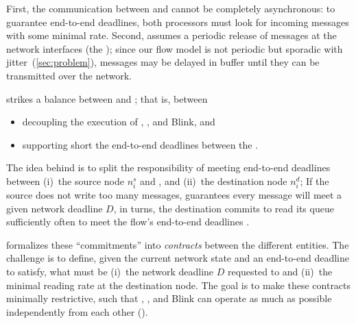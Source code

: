 First, the communication between \APs and \CPs cannot be completely asynchronous: to guarantee end-to-end deadlines, both processors must look for incoming messages with some minimal rate.
%
Second, \blink assumes a periodic release of messages at the network interfaces (\ie the \CPs); since our flow model is not periodic but sporadic with jitter~(\cref{sec:problem}), messages may be delayed in \CPs buffer until they can be transmitted over the network.

\DRP strikes a balance between   and ; that is, between
\begin{itemize}
  \item decoupling the execution of \APs, \CPs, and Blink, and
  \item supporting short the end-to-end deadlines between the \APs.
\end{itemize}
The idea behind \DRP is to split the responsibility of meeting end-to-end deadlines between (i)~the source node $n^s_i$ and \blink, and (ii)~the destination node $n^d_i$;
If the source does not write too many messages, \blink guarantees every message will meet a given network deadline $D$, in turns, the destination commits to read its \bolt queue sufficiently often to meet the flow's end-to-end deadlines \deadlineany.

\DRP formalizes these ``commitments'' into \emph{contracts} between the different entities. The challenge is to define, given the current network state and an end-to-end deadline \deadlineany to satisfy, what must be
  (i)~the network deadline $D$ requested to \blink and
  (ii)~the minimal reading rate at the destination node.
The goal is to make these contracts minimally restrictive, such that \APs, \CPs, and Blink can operate as much as possible independently from each other ().
